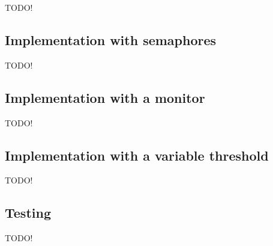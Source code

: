 
TODO!

\subsection{Implementation with semaphores}
\label{sub:bar-sema}
TODO!

\subsection{Implementation with a monitor}
\label{sub:bar-moni}
TODO!

\subsection{Implementation with a variable threshold}
\label{sub:bar-thres}
TODO!


\subsection{Testing}
\label{sub:bar-test}
TODO!